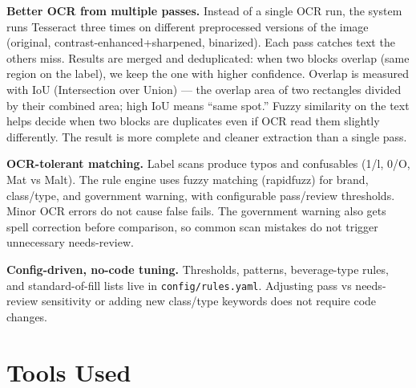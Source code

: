 \documentclass[11pt,a4paper]{article}
\begin{document}
\textbf{Better OCR from multiple passes.} Instead of a single OCR run, the system runs Tesseract three times on different preprocessed versions of the image (original, contrast-enhanced+sharpened, binarized). Each pass catches text the others miss. Results are merged and deduplicated: when two blocks overlap (same region on the label), we keep the one with higher confidence. Overlap is measured with IoU (Intersection over Union) --- the overlap area of two rectangles divided by their combined area; high IoU means ``same spot.'' Fuzzy similarity on the text helps decide when two blocks are duplicates even if OCR read them slightly differently. The result is more complete and cleaner extraction than a single pass.

\textbf{OCR-tolerant matching.} Label scans produce typos and confusables (1/l, 0/O, Mat vs Malt). The rule engine uses fuzzy matching (rapidfuzz) for brand, class/type, and government warning, with configurable pass/review thresholds. Minor OCR errors do not cause false fails. The government warning also gets spell correction before comparison, so common scan mistakes do not trigger unnecessary needs-review.

\textbf{Config-driven, no-code tuning.} Thresholds, patterns, beverage-type rules, and standard-of-fill lists live in \texttt{config/rules.yaml}. Adjusting pass vs needs-review sensitivity or adding new class/type keywords does not require code changes.

\section{Tools Used}
\end{document}
